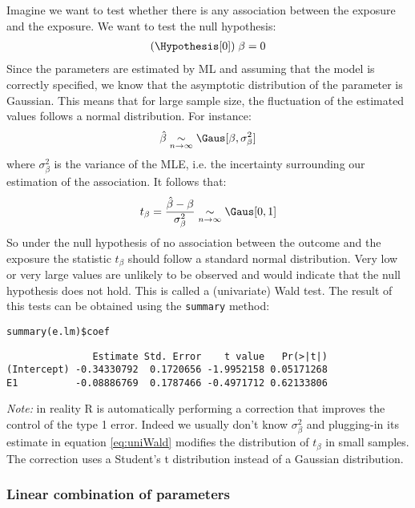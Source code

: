 \documentclass{article}
\begin{document}
Imagine we want to test whether there is any association between the
exposure and the exposure. We want to test the null hypothesis:
\begin{align*}
(\Hypothesis[0]) \; \beta = 0
\end{align*}
 Since the parameters are estimated by ML and assuming that the model
is correctly specified, we know that the asymptotic distribution of
the parameter is Gaussian. This means that for large sample size, the
fluctuation of the estimated values follows a normal distribution. For
instance:
\begin{align*}
\hat{\beta} \underset{n \rightarrow \infty}{\sim} \Gaus[\beta,\sigma^2_\beta]
\end{align*}
where \(\sigma^2_\beta\) is the variance of the MLE, i.e. the
incertainty surrounding our estimation of the association. It follows that:
\begin{align}
t_{\beta} = \frac{\hat{\beta}-\beta}{\sigma^2_\beta} \underset{n \rightarrow \infty}{\sim} \Gaus[0,1] \label{eq:uniWald}
\end{align}
So under the null hypothesis of no association between the outcome and
the exposure the statistic \(t_{\beta}\) should follow a standard
normal distribution. Very low or very large values are unlikely to be
observed and would indicate that the null hypothesis does not
hold. This is called a (univariate) Wald test. The result of this
tests can be obtained using the \texttt{summary} method:
\lstset{language=r,label= ,caption= ,captionpos=b,numbers=none}
\begin{lstlisting}
summary(e.lm)$coef
\end{lstlisting}

\begin{verbatim}
               Estimate Std. Error    t value   Pr(>|t|)
(Intercept) -0.34330792  0.1720656 -1.9952158 0.05171268
E1          -0.08886769  0.1787466 -0.4971712 0.62133806
\end{verbatim}

\emph{Note:} in reality R is automatically performing a correction that
improves the control of the type 1 error. Indeed we usually don't know
\(\sigma^2_\beta\) and plugging-in its estimate in equation
\eqref{eq:uniWald} modifies the distribution of \(t_{\beta}\) in small
samples. The correction uses a Student's t distribution instead of a
Gaussian distribution.

\subsubsection{Linear combination of parameters}
\label{sec:org9944b35}
\end{document}
